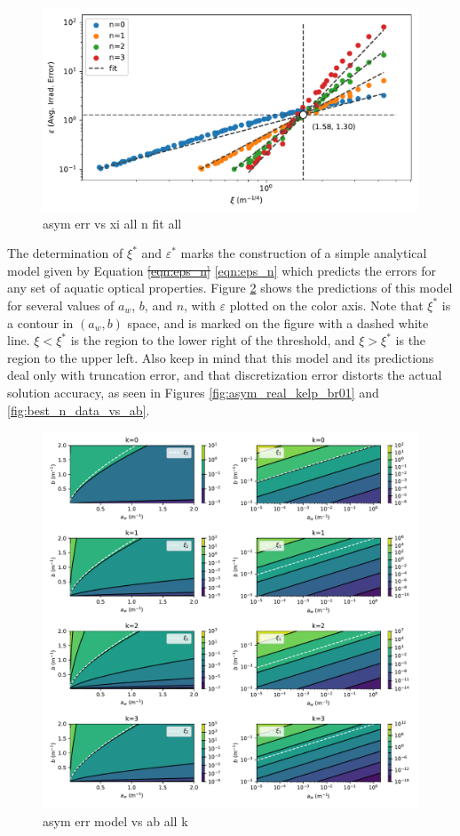 \documentclass[ms,cpyr,lof,lot]{uathesis}
\providecommand{\DIFdel}[1]{{\protect\color{red}\sout{#1}}}                      %
\providecommand{\DIFaddbegin}{} %
\providecommand{\DIFaddend}{} %
\providecommand{\DIFdelbegin}{} %
\providecommand{\DIFdelend}{} %
\newcommand{\DIFscaledelfig}{0.5}
\newlength{\DIFdelgraphicswidth} %
\newlength{\DIFdelgraphicsheight} %
\newcommand{\DIFaddincludegraphics}[2][]{{\color{blue}\fbox{\DIFOincludegraphics[#1]{#2}}}} %
\newcommand{\DIFdelincludegraphics}[2][]{%
\sbox{\DIFdelgraphicsbox}{\DIFOincludegraphics[#1]{#2}}%
\settoboxwidth{\DIFdelgraphicswidth}{\DIFdelgraphicsbox} %
\settoboxtotalheight{\DIFdelgraphicsheight}{\DIFdelgraphicsbox} %
\scalebox{\DIFscaledelfig}{%
\parbox[b]{\DIFdelgraphicswidth}{\usebox{\DIFdelgraphicsbox}\\[-\baselineskip] \rule{\DIFdelgraphicswidth}{0em}}\llap{\resizebox{\DIFdelgraphicswidth}{\DIFdelgraphicsheight}{%
\setlength{\unitlength}{\DIFdelgraphicswidth}%
\begin{picture}(1,1)%
\thicklines\linethickness{2pt} %
{\color[rgb]{1,0,0}\put(0,0){\framebox(1,1){}}}%
{\color[rgb]{1,0,0}\put(0,0){\line( 1,1){1}}}%
{\color[rgb]{1,0,0}\put(0,1){\line(1,-1){1}}}%
\end{picture}%
}\hspace*{3pt}}} %
} %
\DeclareRobustCommand{\DIFaddbegin}{\DIFOaddbegin \let\includegraphics\DIFaddincludegraphics} %
\DeclareRobustCommand{\DIFaddend}{\DIFOaddend \let\includegraphics\DIFOincludegraphics} %
\DeclareRobustCommand{\DIFdelbegin}{\DIFOdelbegin \let\includegraphics\DIFdelincludegraphics} %
\DeclareRobustCommand{\DIFdelend}{\DIFOaddend \let\includegraphics\DIFOincludegraphics} %
\begin{document}
\begin{figure}[H]
  \centering
  \includegraphics[width=5in]{asym_err_vs_xi_all_n_fit_all}
  \caption{asym err vs xi all n fit all}
  \label{fig:asym_err_vs_xi_all_n_fit_all}
\end{figure}

The determination of $\xi^*$ and $\varepsilon^*$ marks the construction of a simple analytical model given by Equation \DIFdelbegin \DIFdel{\ref{eqn:eps_n} }\DIFdelend \DIFaddbegin \eqref{eqn:eps_n} \DIFaddend which predicts the errors for any set of aquatic optical properties.
Figure \ref{fig:asym_err_model_vs_ab_all_k} shows the predictions of this model for several values of $a_w$, $b$, and $n$, with $\varepsilon$ plotted on the color axis.
Note that $\xi^*$ is a contour in $(a_w, b)$ space, and is marked on the figure with a dashed white line.
$\xi<\xi^*$ is the region to the lower right of the threshold, and $\xi>\xi^*$ is the region to the upper left.
Also keep in mind that this model and its predictions deal only with truncation error, and that discretization error distorts the actual solution accuracy, as seen in Figures \ref{fig:asym_real_kelp_br01} and \ref{fig:best_n_data_vs_ab}.

\begin{figure}[H]
  \centering
  \includegraphics[width=5in]{asym_err_model_vs_ab_all_k}
  \caption{asym err model vs ab all k}
  \label{fig:asym_err_model_vs_ab_all_k}
\end{figure}
\end{document}
